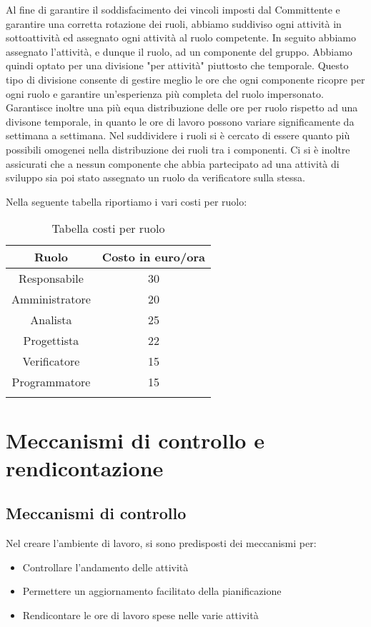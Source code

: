 Al fine di garantire il soddisfacimento dei vincoli imposti dal Committente e garantire una corretta rotazione dei ruoli, abbiamo suddiviso ogni attività in sottoattività ed assegnato ogni attività al ruolo competente. 
In seguito abbiamo assegnato l'attività, e dunque il ruolo, ad un componente del gruppo. Abbiamo quindi optato per una divisione "per attività" piuttosto che temporale. Questo tipo di divisione consente di gestire meglio le ore che ogni componente ricopre per ogni ruolo e garantire un'esperienza più completa del ruolo impersonato. Garantisce inoltre una più equa distribuzione delle ore per ruolo rispetto ad una divisone temporale, in quanto le ore di lavoro possono variare significamente da settimana a settimana.
Nel suddividere i ruoli si è cercato di essere quanto più possibili omogenei nella distribuzione dei ruoli tra i componenti. Ci si è inoltre assicurati che a nessun componente che abbia partecipato ad una attività di sviluppo sia poi stato assegnato un ruolo da verificatore sulla stessa.


Nella seguente tabella riportiamo i vari costi per ruolo:
\begin{center}
\begin{longtable}{|c|c|}
\toprule
\textbf{Ruolo} & \textbf{Costo in euro/ora}\\
\midrule
Responsabile & 30\\
Amministratore & 20\\
Analista & 25\\
Progettista & 22\\
Verificatore & 15\\
Programmatore & 15\\
\bottomrule
\caption{Tabella costi per ruolo}
\label{tab:costiruolo}
\end{longtable}
\end{center}

\section{Meccanismi di controllo e rendicontazione}
\subsection{Meccanismi di controllo}
Nel creare l'ambiente di lavoro, si sono predisposti dei meccanismi per:
\begin{itemize}
\item Controllare l'andamento delle attività
\item Permettere un aggiornamento facilitato della pianificazione
\item Rendicontare le ore di lavoro spese nelle varie attività
\end{itemize}
